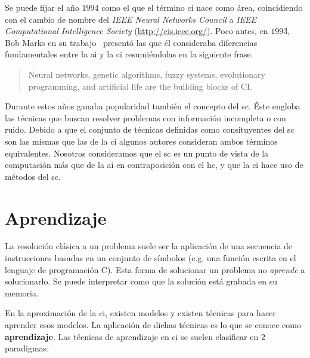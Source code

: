 Se puede fijar el año $1994$ como el que el término \ac{ci} nace como área, coincidiendo con el cambio de nombre del \textit{IEEE Neural Networks Council} a \textit{IEEE Computational Intelligence Society} (\url{http://cis.ieee.org/}). Poco antes, en $1993$, Bob Marks en su trabajo~\cite{bezdek1993intelligence} presentó las que él consideraba diferencias fundamentales entre la \ac{ai} y la \ac{ci} resumiéndolas en la siguiente frase.

\blockquote{Neural networks, genetic algorithms, fuzzy systems, evolutionary programming, and artificial life are the building blocks of CI.}

Durante estos años ganaba popularidad también el concepto del \ac{sc}. Éste engloba las técnicas que buscan resolver problemas con información incompleta o con ruido. Debido a que el conjunto de técnicas definidas como consituyentes del \ac{sc} son las mismas que las de la \ac{ci} algunos autores consideran ambos términos equivalentes. Nosotros consideramos que el \ac{sc} es un punto de vista de la computación más que de la \ac{ai} en contraposición con el \ac{hc}, y que la \ac{ci} hace uso de métodos del \ac{sc}.

\section{Aprendizaje}

La resolución clásica a un problema suele ser la aplicación de una secuencia de instrucciones basadas en un conjunto de símbolos (e.g. una función escrita en el lenguaje de programación C). Esta forma de solucionar un problema no \textit{aprende} a solucionarlo. Se puede interpretar como que la solución está grabada en su memoria.

En la aproximación de la \ac{ci}, existen modelos y existen técnicas para hacer aprender esos modelos. La aplicación de dichas técnicas es lo que se conoce como \textbf{aprendizaje}. Las técnicas de aprendizaje en \ac{ci} se suelen clasificar en $2$ paradigmas:

